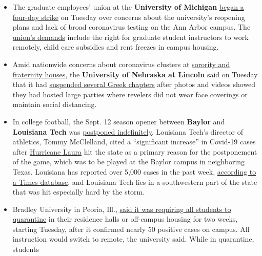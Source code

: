 \begin{itemize}
\item
  The graduate employees' union at the \textbf{University of Michigan}
  \href{https://twitter.com/geo3550/status/1302997874997944322}{began a
  four-day strike} on Tuesday over concerns about the university's
  reopening plans and lack of broad coronavirus testing on the Ann Arbor
  campus. The
  \href{https://www.geo3550.org/2020/09/04/geos-demands-for-a-safe-and-just-pandemic-response-for-all/}{union's
  demands} include the right for graduate student instructors to work
  remotely, child care subsidies and rent freezes in campus housing.
\item
  Amid nationwide concerns about coronavirus clusters at
  \href{https://www.nytimes3xbfgragh.onion/2020/08/18/us/coronavirus-fraternities-sororities.html}{sorority
  and fraternity houses}, the \textbf{University of Nebraska at Lincoln}
  said on Tuesday that it had
  \href{https://news.unl.edu/newsrooms/today/article/greek-houses-placed-on-temporary-suspension/}{suspended
  several Greek chapters} after photos and videos showed they had hosted
  large parties where revelers did not wear face coverings or maintain
  social distancing.
\item
  In college football, the Sept. 12 season opener between
  \textbf{Baylor} and \textbf{Louisiana Tech} was
  \href{https://latechsports.com/news/2020/9/8/football-baylor-louisiana-tech-season-opener-postponed.aspx}{postponed
  indefinitely}. Louisiana Tech's director of athletics, Tommy
  McClelland, cited a ``significant increase'' in Covid-19 cases after
  \href{https://www.nytimes3xbfgragh.onion/2020/08/28/us/hurricane-laura-damage-lake-charles.html}{Hurricane
  Laura} hit the state as a primary reason for the postponement of the
  game, which was to be played at the Baylor campus in neighboring
  Texas. Louisiana has reported over 5,000 cases in the past week,
  \href{https://www.nytimes3xbfgragh.onion/interactive/2020/us/coronavirus-us-cases.html\#states}{according
  to a Times database}, and Louisiana Tech lies in a southwestern part
  of the state that was hit especially hard by the storm.
\item
  Bradley University in Peoria, Ill.,
  \href{https://www.bradley.edu/sites/coronavirus/communications/20200908president.dot}{said
  it was requiring all students to quarantine} in their residence halls
  or off-campus housing for two weeks, starting Tuesday, after it
  confirmed nearly 50 positive cases on campus. All instruction would
  switch to remote, the university said. While in quarantine, students

\end{itemize}
